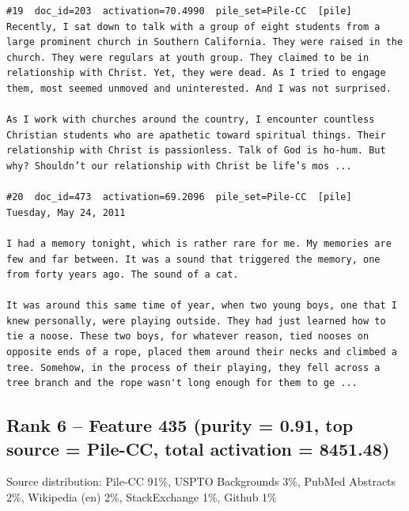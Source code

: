 \begin{verbatim}
#19  doc_id=203  activation=70.4990  pile_set=Pile-CC  [pile]
Recently, I sat down to talk with a group of eight students from a large prominent church in Southern California. They were raised in the church. They were regulars at youth group. They claimed to be in relationship with Christ. Yet, they were dead. As I tried to engage them, most seemed unmoved and uninterested. And I was not surprised.

As I work with churches around the country, I encounter countless Christian students who are apathetic toward spiritual things. Their relationship with Christ is passionless. Talk of God is ho-hum. But why? Shouldn’t our relationship with Christ be life’s mos ...

#20  doc_id=473  activation=69.2096  pile_set=Pile-CC  [pile]
Tuesday, May 24, 2011

I had a memory tonight, which is rather rare for me. My memories are few and far between. It was a sound that triggered the memory, one from forty years ago. The sound of a cat.

It was around this same time of year, when two young boys, one that I knew personally, were playing outside. They had just learned how to tie a noose. These two boys, for whatever reason, tied nooses on opposite ends of a rope, placed them around their necks and climbed a tree. Somehow, in the process of their playing, they fell across a tree branch and the rope wasn't long enough for them to ge ...

\end{verbatim}

\subsection*{Rank 6 -- Feature 435 (purity = 0.91, top source = Pile-CC, total activation = 8451.48)}

Source distribution: Pile-CC 91\%, USPTO Backgrounds 3\%, PubMed Abstracts 2\%, Wikipedia (en) 2\%, StackExchange 1\%, Github 1\%

